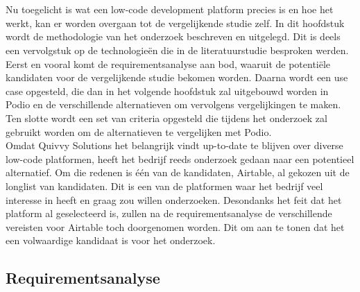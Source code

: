 
\chapter{}%
\label{ch:methodologie}



Nu toegelicht is wat een low-code development platform precies is en hoe het werkt, kan er worden overgaan tot de vergelijkende studie zelf. In dit hoofdstuk wordt de methodologie van het onderzoek beschreven en uitgelegd. Dit is deels een vervolgstuk op de technologieën die in de literatuurstudie besproken werden. Eerst en vooral komt de requirementsanalyse aan bod, waaruit de potentiële kandidaten voor de vergelijkende studie bekomen worden. Daarna wordt een use case opgesteld, die dan in het volgende hoofdstuk zal uitgebouwd worden in Podio en de verschillende alternatieven om vervolgens vergelijkingen te maken. Ten slotte wordt een set van criteria opgesteld die tijdens het onderzoek zal gebruikt worden om de alternatieven te vergelijken met Podio. \\

Omdat Quivvy Solutions het belangrijk vindt up-to-date te blijven over diverse low-code platformen, heeft het bedrijf reeds onderzoek gedaan naar een potentieel alternatief. Om die redenen is één van de kandidaten, Airtable, al gekozen uit de longlist van kandidaten. Dit is een van de platformen waar het bedrijf veel interesse in heeft en graag zou willen onderzoeken. Desondanks het feit dat het platform al geselecteerd is, zullen na de requirementsanalyse de verschillende vereisten voor Airtable toch doorgenomen worden. Dit om aan te tonen dat het een volwaardige kandidaat is voor het onderzoek. \\


\section{Requirementsanalyse}
\label{sec:requirementsanalyse}

